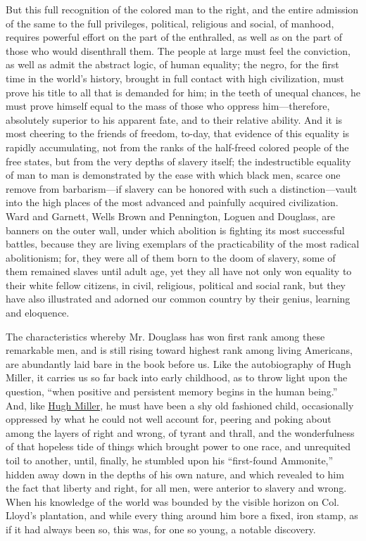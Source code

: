 But this full recognition of the colored man to the right, and the
entire admission of the same to the full privileges, political,
religious and social, of manhood, requires powerful effort on the part
of the enthralled, as well as on the part of those who would disenthrall
them. The people at large must feel the conviction, as well as admit the
abstract logic, of human equality; the negro, for the first time in the
world's history, brought in full contact with high civilization, must
prove his title to all that is demanded for him; in the teeth of unequal
chances, he must prove himself equal to the mass of those who oppress
him---therefore, absolutely superior to his apparent fate, and to their
relative ability. And it is most cheering to the friends of freedom,
to-day, that evidence of this equality is
{\protect\hypertarget{xviii}{}{}}rapidly accumulating, not from the
ranks of the half-freed colored people of the free states, but from the
very depths of slavery itself; the indestructible equality of man to man
is demonstrated by the ease with which black men, scarce one remove from
barbarism---if slavery can be honored with such a distinction---vault
into the high places of the most advanced and painfully acquired
civilization. Ward and Garnett, Wells Brown and Pennington, Loguen and
Douglass, are banners on the outer wall, under which abolition is
fighting its most successful battles, because they are living exemplars
of the practicability of the most radical abolitionism; for, they were
all of them born to the doom of slavery, some of them remained slaves
until adult age, yet they all have not only won equality to their white
fellow citizens, in civil, religious, political and social rank, but
they have also illustrated and adorned our common country by their
genius, learning and eloquence.

The characteristics whereby Mr. Douglass has won first rank among these
remarkable men, and is still rising toward highest rank among living
Americans, are abundantly laid bare in the book before us. Like the
autobiography of Hugh Miller, it carries us so far back into early
childhood, as to throw light upon the question, ``when positive and
persistent memory begins in the human being.'' And, like
\href{/wiki/Author:Hugh_Miller_(1802-1856)}{Hugh Miller}, he must have
been a shy old fashioned child, occasionally oppressed by what he could
not well account for, peering and poking about among the layers of right
and wrong, of tyrant and thrall, and the wonderfulness of that hopeless
tide of things which brought power to one race, and unrequited toil to
another, until, finally, he stumbled upon his ``first-found Ammonite,''
hidden away down in the depths of his own nature, and which revealed to
him the fact that liberty and right, for all men, were anterior to
slavery and wrong. When his knowledge of the world was bounded by the
visible horizon on Col. Lloyd's plantation, and while every thing around
him bore a fixed, iron stamp, as if it had always been so, this was, for
one so young, a notable discovery.

